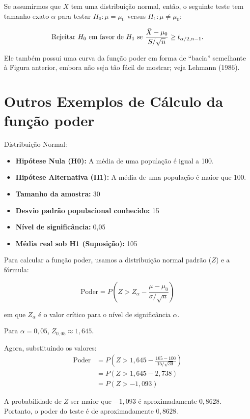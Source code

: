 \documentclass[12pt]{beamer}
\begin{document}
\begin{frame}{}
\begin{block}{}
\justifying
Se assumirmos que $X$ tem uma distribuição normal, então, o seguinte teste tem tamanho exato $\alpha$ para testar $H_0 : \mu = \mu_0$ versus $H_1 : \mu \neq \mu_0$:

\begin{align}
\text{Rejeitar } H_0 \text{ em favor de } H_1 \text{ se } \frac{\Bar{X} - \mu_0}{S/\sqrt{n}} \geq t_{\alpha/2, n-1}. 
\end{align}

Ele também possui uma curva da função poder em forma de ``bacia'' semelhante à Figura anterior, embora não seja tão fácil de mostrar; veja Lehmann (1986).
\end{block}
\end{frame}

\section{Outros Exemplos de Cálculo da função poder}
\begin{frame}{}
\begin{block}{Distribuição Normal:}
\justifying

\begin{itemize}
\item \textbf{Hipótese Nula (H0):} A média de uma população é igual a 100.
\item \textbf{Hipótese Alternativa (H1):} A média de uma população é maior que 100.
\item \textbf{Tamanho da amostra:} 30
\item \textbf{Desvio padrão populacional conhecido:} 15
\item \textbf{Nível de significância:} 0,05
\item \textbf{Média real sob H1 (Suposição):} 105
\end{itemize}

Para calcular a função poder, usamos a distribuição normal padrão ($Z$) e a fórmula:

\[ \text{Poder} = P(Z > Z_{\alpha} - \frac{\mu - \mu_0}{\sigma/\sqrt{n}}) \]

em que $Z_{\alpha}$ é o valor crítico para o nível de significância $\alpha$.
\end{block}
\end{frame}

\begin{frame}{}
\begin{block}{}
\justifying
Para $\alpha = 0,05$, $Z_{0,05} \approx 1,645.$

Agora, substituindo os valores:
\begin{align*}
    \text{Poder} &= P(Z > 1,645 - \frac{105 - 100}{15/\sqrt{30}})\\
    &= P(Z > 1,645 - 2,738)\\
    &= P(Z > -1,093)
\end{align*}

A probabilidade de $Z$ ser maior que $-1,093$ é aproximadamente $0,8628$. Portanto, o poder do teste é de aproximadamente $0,8628$.
\end{block}
\end{frame}
\end{document}
